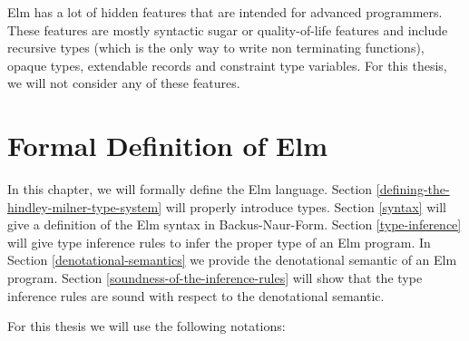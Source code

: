 \documentclass[]{scrbook}
\theoremstyle{definition}
\theoremstyle{definition}
\theoremstyle{definition}
\theoremstyle{remark}
\begin{document}
Elm has a lot of hidden features that are intended for advanced
programmers. These features are mostly syntactic sugar or
quality-of-life features and include recursive types (which is the only
way to write non terminating functions), opaque types, extendable
records and constraint type variables. For this thesis, we will not
consider any of these features.

\chapter{Formal Definition of Elm}\label{formal-definition-of-elm}

In this chapter, we will formally define the Elm language. Section
\ref{defining-the-hindley-milner-type-system} will properly introduce
types. Section \ref{syntax} will give a definition of the Elm syntax in
Backus-Naur-Form. Section \ref{type-inference} will give type inference
rules to infer the proper type of an Elm program. In Section
\ref{denotational-semantics} we provide the denotational semantic of an
Elm program. Section \ref{soundness-of-the-inference-rules} will show
that the type inference rules are sound with respect to the denotational
semantic.

For this thesis we will use the following notations:
\end{document}
